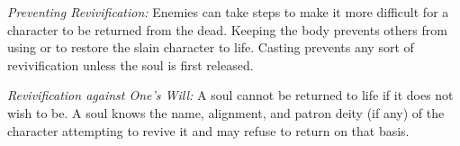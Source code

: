 \textit{Preventing Revivification:} Enemies can take steps to make it more difficult for a character to be returned from the dead. Keeping the body prevents others from using  or  to restore the slain character to life. Casting  prevents any sort of revivification unless the soul is first released.

\textit{Revivification against One's Will:} A soul cannot be returned to life if it does not wish to be. A soul knows the name, alignment, and patron deity (if any) of the character attempting to revive it and may refuse to return on that basis.
